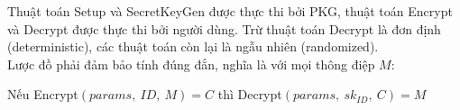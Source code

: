 \documentclass[class=report, crop=false]{standalone}
\begin{document}
\begin{definition}[IBE]
			Thuật toán \textsf{Setup} và \textsf{SecretKeyGen} được thực thi bởi PKG, thuật toán \textsf{Encrypt} và \textsf{Decrypt} được thực thi bởi người dùng. Trừ thuật toán \textsf{Decrypt} là đơn định (deterministic), các thuật toán còn lại là ngẫu nhiên (randomized). \\ \indent
			Lược đồ phải đảm bảo tính đúng đắn, nghĩa là với mọi thông điệp $M$:
			\vspace{-\baselineskip}
			\begin{center}
				Nếu \hspace{1ex} \textsf{Encrypt}$(params,\ ID,\ M) = C$ \hspace{1ex} thì \hspace{1ex} \textsf{Decrypt}$(params,\ sk_{ID},\ C) = M$
			\end{center}
		\end{definition}
		\newpage
\end{document}
